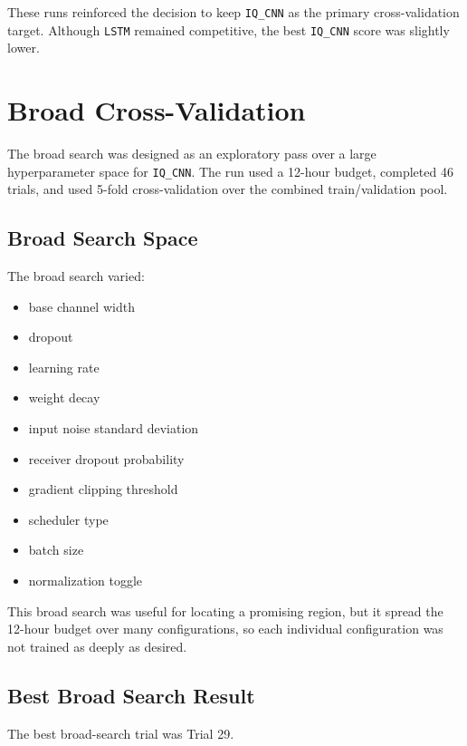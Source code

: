 \documentclass[11pt]{article}
\begin{document}
These runs reinforced the decision to keep \texttt{IQ\_CNN} as the primary cross-validation target. Although \texttt{LSTM} remained competitive, the best \texttt{IQ\_CNN} score was slightly lower.

\section{Broad Cross-Validation}
The broad search was designed as an exploratory pass over a large hyperparameter space for \texttt{IQ\_CNN}. The run used a 12-hour budget, completed 46 trials, and used 5-fold cross-validation over the combined train/validation pool.

\subsection{Broad Search Space}
The broad search varied:
\begin{itemize}
    \item base channel width
    \item dropout
    \item learning rate
    \item weight decay
    \item input noise standard deviation
    \item receiver dropout probability
    \item gradient clipping threshold
    \item scheduler type
    \item batch size
    \item normalization toggle
\end{itemize}

This broad search was useful for locating a promising region, but it spread the 12-hour budget over many configurations, so each individual configuration was not trained as deeply as desired.

\subsection{Best Broad Search Result}
The best broad-search trial was Trial 29.
\end{document}
